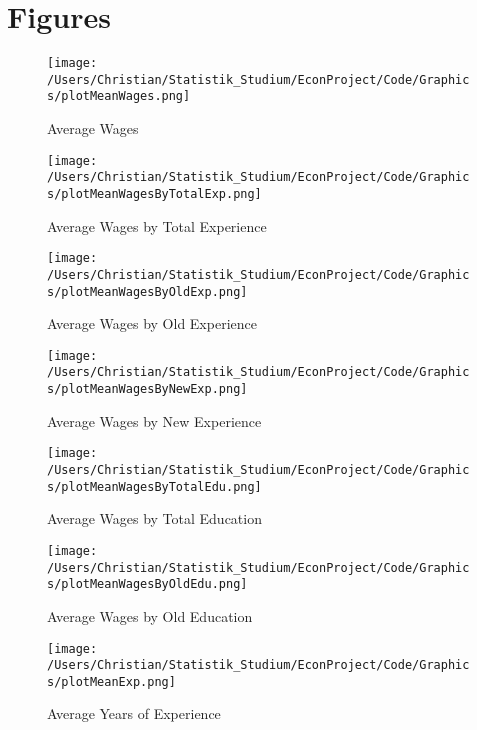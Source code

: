 \section{Figures}

 
\begin{figure}[!h]
    \centering
    \texttt{[image: /Users/Christian/Statistik\_Studium/EconProject/Code/Graphics/plotMeanWages.png]}
    \caption{Average Wages}
    \label{fig:MeanWages}
\end{figure}

\begin{figure}[!h]
    \centering
    \texttt{[image: /Users/Christian/Statistik\_Studium/EconProject/Code/Graphics/plotMeanWagesByTotalExp.png]}
    \caption{Average Wages by Total Experience}
    \label{fig:MeanWagesByTotalExp}
\end{figure}

\begin{figure}[!h]
    \centering
    \texttt{[image: /Users/Christian/Statistik\_Studium/EconProject/Code/Graphics/plotMeanWagesByOldExp.png]}
    \caption{Average Wages by Old Experience}
    \label{fig:MeanWagesByOldExp}
\end{figure}

\begin{figure}[!h]
    \centering
    \texttt{[image: /Users/Christian/Statistik\_Studium/EconProject/Code/Graphics/plotMeanWagesByNewExp.png]}
    \caption{Average Wages by New Experience}
    \label{fig:MeanWagesByNewExp}
\end{figure}

\begin{figure}[!h]
    \centering
    \texttt{[image: /Users/Christian/Statistik\_Studium/EconProject/Code/Graphics/plotMeanWagesByTotalEdu.png]}
    \caption{Average Wages by Total Education}
    \label{fig:MeanWagesByTotalEdu}
\end{figure}

\begin{figure}[!h]
    \centering
    \texttt{[image: /Users/Christian/Statistik\_Studium/EconProject/Code/Graphics/plotMeanWagesByOldEdu.png]}
    \caption{Average Wages by Old Education}
    \label{fig:MeanWagesByOldEdu}
\end{figure}

\begin{figure}[!h]
    \centering
    \texttt{[image: /Users/Christian/Statistik\_Studium/EconProject/Code/Graphics/plotMeanExp.png]}
    \caption{Average Years of Experience}
    \label{fig:MeanExp}
\end{figure}

